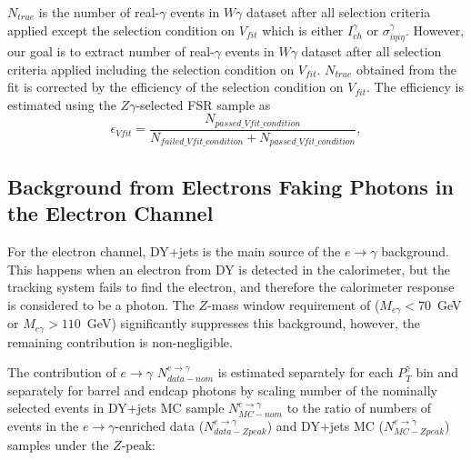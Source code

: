 $N_{true}$ is the number of real-$\gamma$ events in $W\gamma$ dataset after all selection criteria applied except the selection condition on $V_{fit}$ which is either $I_{ch}^{\gamma}$ or $\sigma_{i\eta i\eta}^{\gamma}$. However, our goal is to extract number of real-$\gamma$ events in $W\gamma$ dataset after all selection criteria applied including the selection condition on $V_{fit}$. $N_{true}$ obtained from the fit is corrected by the efficiency of the selection condition on $V_{fit}$. The efficiency is estimated using the $Z\gamma$-selected FSR sample as 
\begin{equation}
 \epsilon_{Vfit} = \frac{N_{passed\_Vfit\_condition}}{N_{failed\_Vfit\_condition}+N_{passed\_Vfit\_condition}},
\end{equation}


\subsection{Background from Electrons Faking Photons in the Electron Channel}
\label{sec:BackgroundSubtraction_etog}

For the electron channel, DY+jets is the main source of the $e \rightarrow \gamma$ background. This happens when an electron from DY is detected in the calorimeter, but the tracking system fails to find the electron, and therefore the calorimeter response is considered to be a photon. The $Z$-mass window requirement of ($M_{e\gamma}<70$~GeV or $M_{e\gamma}>110$~GeV) significantly suppresses this background, however, the remaining contribution is non-negligible. 

The contribution of $e\rightarrow\gamma$ $N_{data-nom}^{e\rightarrow\gamma}$ is estimated separately for each $P_{T}^{\gamma}$ bin and separately for barrel and endcap photons by scaling number of the nominally selected events in DY+jets MC sample $N_{MC-nom}^{e\rightarrow\gamma}$ to the ratio of numbers of events in the  $e\rightarrow\gamma$-enriched data ($N_{data-Zpeak}^{e\rightarrow\gamma}$) and DY+jets MC ($N_{MC-Zpeak}^{e\rightarrow\gamma}$) samples under the $Z$-peak: 

